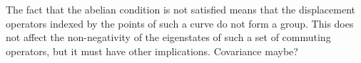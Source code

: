 \documentclass[a4paper]{article}
\begin{document}
  The fact that the abelian condition is not satisfied means
  that the displacement operators indexed by the points of
  such a curve do not form a group. This does not affect the
  non-negativity of the eigenstates of such a set of
  commuting operators, but it must have other implications.
  Covariance maybe?
\end{document}

